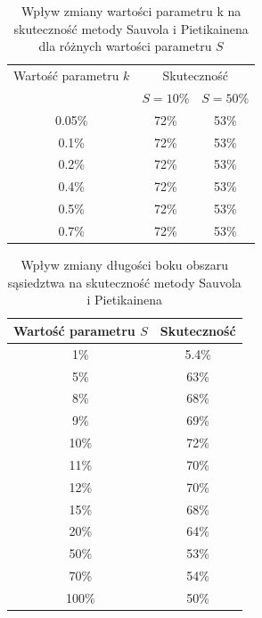 \begin {table}
  \begin{center}
    \begin{tabular}{c | c | c}
      Wartość parametru $k$ & \multicolumn{2}{c}{Skuteczność} \\
      \cline{2-3}
      & $S = 10\%$ & $S = 50\%$ \\
      \hline
      0.05\% & 72\% & 53\% \\
      0.1\% & 72\% & 53\% \\
      0.2\% & 72\% & 53\% \\
      0.4\% & 72\% & 53\% \\
      0.5\% & 72\% & 53\% \\
      0.7\% & 72\% & 53\%
    \end{tabular}
    \caption {Wpływ zmiany wartości parametru k na skuteczność metody Sauvola i Pietikainena dla różnych wartości parametru $S$}
    \label{tab:sauvol_pietikainen_parametr_k} 
  \end{center}
\end {table}

\begin {table}
  \begin{center}
    \begin{tabular}{c | c}
      Wartość parametru $S$ & Skuteczność \\
      \hline
      1\% & 5.4\% \\
      5\% & 63\% \\
      8\% & 68\% \\
      9\% & 69\% \\
      10\% & 72\% \\
      11\% & 70\% \\
      12\% & 70\% \\
      15\% & 68\% \\
      20\% & 64\% \\
      50\% & 53\% \\
      70\% & 54\% \\
      100\% & 50\%
    \end{tabular}
    \caption {Wpływ zmiany długości boku obszaru sąsiedztwa na skuteczność metody Sauvola i Pietikainena}
    \label{tab:sauvol_pietikainen_dlugosc_boku} 
  \end{center}
\end {table}

